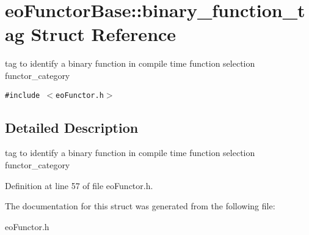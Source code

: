 \section{eo\-Functor\-Base::binary\_\-function\_\-tag Struct Reference}
\label{structeo_functor_base_1_1binary__function__tag}
tag to identify a binary function in compile time function selection functor\_\-category  


{\tt \#include $<$eo\-Functor.h$>$}



\subsection{Detailed Description}
tag to identify a binary function in compile time function selection functor\_\-category 



Definition at line 57 of file eo\-Functor.h.

The documentation for this struct was generated from the following file:\begin{CompactItemize}
\item 
eo\-Functor.h\end{CompactItemize}
